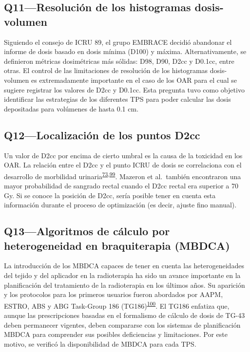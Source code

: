 \documentclass[
  a4paper,
]{scrreprt}
\begin{document}
\hypertarget{sec-q11}{%
\subsection{Q11---Resolución de los histogramas
dosis-volumen}\label{sec-q11}}

Siguiendo el consejo de ICRU 89, el grupo EMBRACE decidió abandonar el
informe de dosis basado en dosis mínima (D100) y máxima.
Alternativamente, se definieron métricas dosimétricas más sólidas: D98,
D90, D2cc y D0.1cc, entre otras. El control de las limitaciones de
resolución de los histogramas dosis-volumen es extremadamente importante
en el caso de los OAR para el cual se sugiere registrar los valores de
D2cc y D0.1cc. Esta pregunta tuvo como objetivo identificar las
estrategias de los diferentes TPS para poder calcular las dosis
depositadas para volúmenes de hasta 0.1 cm.

\hypertarget{sec-q12}{%
\subsection{Q12---Localización de los puntos D2cc}\label{sec-q12}}

Un valor de D2cc por encima de cierto umbral es la causa de la toxicidad
en los OAR. La relación entre el D2cc y el punto ICRU de dosis se
correlaciona con el desarrollo de morbilidad
urinaria\textsuperscript{\protect\hyperlink{ref-mazeron2015}{73},\protect\hyperlink{ref-nkiwane2015}{99}}.
Mazeron et al.~también encontraron una mayor probabilidad de sangrado
rectal cuando el D2cc rectal era superior a 70 Gy. Si se conoce la
posición de D2cc, sería posible tener en cuenta esta información durante
el proceso de optimización (es decir, ajuste fino manual).

\hypertarget{sec-q13}{%
\subsection{Q13---Algoritmos de cálculo por heterogeneidad en
braquiterapia (MBDCA)}\label{sec-q13}}

La introducción de los MBDCA capaces de tener en cuenta las
heterogeneidades del tejido y del aplicador en la radioterapia ha sido
un avance importante en la planificación del tratamiento de la
radioterapia en los últimos años. Su aparición y los protocolos para los
primeros usuarios fueron abordados por AAPM, ESTRO, ABS y ABG Task-Group
186 (TG186)\textsuperscript{\protect\hyperlink{ref-beaulieu2012}{100}}.
El TG186 enfatiza que, aunque las prescripciones basadas en el
formalismo de cálculo de dosis de TG-43 deben permanecer vigentes, deben
compararse con los sistemas de planificación MBDCA para comprender sus
posibles deficiencias y limitaciones. Por este motivo, se verificó la
disponibilidad de MBDCA para cada TPS.
\end{document}
